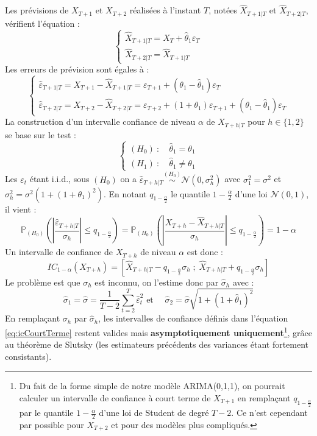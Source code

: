 \documentclass[,french]{article}
\begin{document}
Les prévisions de \(X_{T+1}\) et \(X_{T+2}\) réalisées à l'instant \(T\), notées \(\hat X_{T+1\vert T}\) et \(\hat X_{T+2\vert T}\), vérifient l'équation :
\[
\begin{cases}
\hat X_{T+1\vert T}=X_T + \hat\theta_1\varepsilon_T \\
\hat X_{T+2\vert T}=\hat X_{T+1\vert T}
\end{cases}
\]
Les erreurs de prévision sont égales à :
\[
\begin{cases}
\hat \varepsilon_{T+1\vert T} = X_{T+1} - \hat X_{T+1\vert T}=
\varepsilon_{T+1}+(\theta_1-\hat\theta_1)\varepsilon_T
\\
\hat \varepsilon_{T+2\vert T} = X_{T+2} - \hat X_{T+2\vert T}=
\varepsilon_{T+2}+(1+\theta_1)\varepsilon_{T+1}+(\theta_1-\hat\theta_1)\varepsilon_T 
\end{cases}
\]
La construction d'un intervalle confiance de niveau \(\alpha\) de \(X_{T+h\vert T}\) pour \(h \in \{1,2\}\) se base sur le test :
\[
\begin{cases}
(H_0)\::\:&\hat \theta_1 = \theta_1 \\
(H_1)\::\:&\hat \theta_1 \ne \theta_1 
\end{cases}
\]
Les \(\varepsilon_t\) étant i.i.d., sous \((H_0)\) on a \(\hat \varepsilon_{T+h\vert T} \overset{(H_0)}{\sim}\mathcal N(0,\sigma_h^2)\) avec \(\sigma_1^2=\sigma^2\) et \(\sigma_h^2=\sigma^2(1+(1+\theta_1)^2)\). En notant \(q_{1-\frac \alpha 2}\) le quantile \(1-\frac \alpha 2\) d'une loi \(\mathcal N(0,1)\), il vient :
\[
\mathbb P_{(H_0)}\left(
\left\lvert
\frac{\hat \varepsilon_{T+h\vert T}}{\sigma_h}
\right\rvert\leq q_{1-\frac{\alpha}{2}}
\right)=
\mathbb P_{(H_0)}\left(
\left\lvert
\frac{X_{T+h} - \hat X_{T+h\vert T}}{\sigma_h}
\right\rvert\leq q_{1-\frac{\alpha}{2}}
\right)=
1-\alpha
\]
Un intervalle de confiance de \(X_{T+h}\) de niveau \(\alpha\) est donc :
\begin{equation}
IC_{1-\alpha}(X_{T+h}) = \left[
\hat X_{T+h\vert T}-q_{1-\frac \alpha 2}{\sigma}_h\;;\;
\hat X_{T+h\vert T}+q_{1-\frac \alpha 2}{\sigma}_h
\right]
\label{eq:icCourtTerme}
\end{equation}
Le problème est que \(\sigma_h\) est inconnu, on l'estime donc par \(\hat \sigma_h\) avec :
\[
\hat\sigma_1 = \hat\sigma=  \frac{1}{T-2}\sum_{t=2}^T\hat\varepsilon_t^2
\text{ et }\quad
\hat\sigma_2=\hat\sigma\sqrt{1+(1+\hat \theta_1)^2}
\]
En remplaçant \(\sigma_h\) par \(\hat\sigma_h\), les intervalles de confiance définis dans l'équation \eqref{eq:icCourtTerme} restent valides mais \textbf{asymptotiquement uniquement}\footnote{Du fait de la forme simple de notre modèle ARIMA(0,1,1), on pourrait calculer un intervalle de confiance à court terme de \(X_{T+1}\) en remplaçant \(q_{1-\frac\alpha 2}\) par le quantile \(1-\frac\alpha 2\) d'une loi de Student de degré \(T-2\). Ce n'est cependant par possible pour \(X_{T+2}\) et pour des modèles plus compliqués. }, grâce au théorème de Slutsky (les estimateurs précédents des variances étant fortement consistants).
\end{document}
